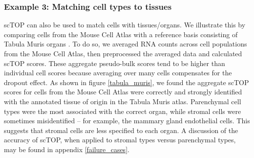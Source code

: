 \documentclass[aps,superscriptaddress, notitlepage,longbibliography]{revtex4-1}
\begin{document}
\subsubsection{Example 3: Matching cell types to tissues}

scTOP can also be used to match cells with tissues/organs. We illustrate this by comparing cells from the Mouse Cell Atlas with a reference basis consisting of Tabula Muris organs \cite{schaum_single-cell_2018}. To do so, we averaged RNA counts across cell populations from the Mouse Cell Atlas, then preprocessed the averaged data and calculated scTOP scores. These aggregate pseudo-bulk scores tend to be higher than individual cell scores because averaging over many cells compensates for the dropout effect. As shown in figure \ref{tabula_muris}, we found the aggregate scTOP scores for cells from the Mouse Cell Atlas were correctly and strongly identified with the annotated tissue of origin in the Tabula Muris atlas. Parenchymal cell types were the most associated with the correct organ, while stromal cells were sometimes misidentified -- for example, the mammary gland endothelial cells. This suggests that stromal cells are less specified to each organ. A discussion of the accuracy of scTOP, when applied to stromal types versus parenchymal types, may be found in appendix \ref{failure_cases}.
\end{document}
